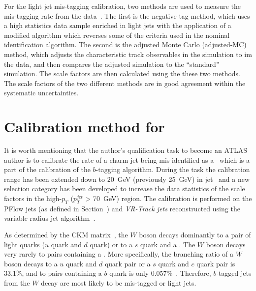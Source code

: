 For the light jet mis-tagging calibration, two methods are 
used to measure the mis-tagging rate from the data~\cite{ATLAS-CONF-2018-006}. 
The first is the negative tag method, which uses a high statistics data sample enriched 
in light jets with the application of a modified algorithm which 
reverses some of the criteria used in the nominal identification 
algorithm.
The second is the adjusted Monte Carlo (adjusted-MC) method, which 
adjusts the characteristic track observables in the simulation 
to im the data, and then compares the adjusted simulation to the 
``standard'' simulation. The scale factors are then calculated using 
the these two methods. The scale factors of the two different methods 
are in good agreement within the systematic uncertainties. 
\section{Calibration method for \cjet}
\label{sec:Calibration method for charm jet}
It is worth mentioning that the author's qualification task to become an ATLAS author is to 
calibrate the rate of a charm jet being mis-identified as a \bjet\, which is a part 
of the calibration of the $b$-tagging algorithm.
During the task the calibration range has been extended down to 20~GeV (previously 25~GeV) in
jet \pt\ and a new selection category has been developed 
to increase the data statistics of the scale factors in the 
high-$p_T$ ($p_T^{jet}$ > 70~GeV) region.
The calibration is performed on the PFlow jets (as defined in Section~\label{sec:jet})
and \textit{VR-Track jets} reconstructed using the variable radius jet algorithm~\cite{VRTrackJet}.

As determined by the CKM matrix~\cite{CKM1,CKM2}, the $W$ boson decays dominantly to 
a pair of light quarks ($u$ quark and $d$ quark) or to
a $s$ quark and a \cquark. The $W$ boson decays very rarely to pairs containing a \bquark. 
More specifically, the branching ratio of a $W$ boson decays to a $u$ quark and $d$ quark pair or 
a $s$ quark and $c$ quark pair is 33.1\%, and to pairs containing a $b$ quark is only 0.057\%~\cite{PDG}. 
Therefore, $b$-tagged jets from the $W$ decay are most likely 
to be mis-tagged \cjets or light jets. 

